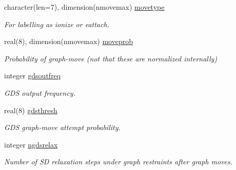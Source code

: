 \begin{DoxyCompactItemize}
character(len=7), dimension(nmovemax) \mbox{\hyperlink{namespaceglobaldata_a9ee2df5138a5c5d4c613d2bde5bd7128}{movetype}}
\begin{DoxyCompactList}\small\item\em For labelling as \textquotesingle{}ionize\textquotesingle{} or \textquotesingle{}eattach\textquotesingle{}. \end{DoxyCompactList}\item 
\mbox{\label{namespaceglobaldata_a51bb947ac9e6f596144cc7183c310d4d}} 
real(8), dimension(nmovemax) \mbox{\hyperlink{namespaceglobaldata_a51bb947ac9e6f596144cc7183c310d4d}{moveprob}}
\begin{DoxyCompactList}\small\item\em Probability of graph-\/move (not that these are normalized internally) \end{DoxyCompactList}\item 
\mbox{\label{namespaceglobaldata_a077f121f0b15b5b062ec11ce2003e9ab}} 
integer \mbox{\hyperlink{namespaceglobaldata_a077f121f0b15b5b062ec11ce2003e9ab}{gdsoutfreq}}
\begin{DoxyCompactList}\small\item\em G\+DS output frequency. \end{DoxyCompactList}\item 
\mbox{\label{namespaceglobaldata_a6fe1162ad1616cd3ca3ddf498e51676b}} 
real(8) \mbox{\hyperlink{namespaceglobaldata_a6fe1162ad1616cd3ca3ddf498e51676b}{gdsthresh}}
\begin{DoxyCompactList}\small\item\em G\+DS graph-\/move attempt probability. \end{DoxyCompactList}\item 
\mbox{\label{namespaceglobaldata_a1f7a45244a12002ba3eff0cafdf2a2b5}} 
integer \mbox{\hyperlink{namespaceglobaldata_a1f7a45244a12002ba3eff0cafdf2a2b5}{ngdsrelax}}
\begin{DoxyCompactList}\small\item\em Number of SD relaxation steps under graph restraints after graph moves. \end{DoxyCompactList}\item 
\mbox{\label{namespaceglobaldata_a3cb6c7ae6391331e0c9d9cf264c1e7a2}} 

\end{DoxyCompactItemize}

